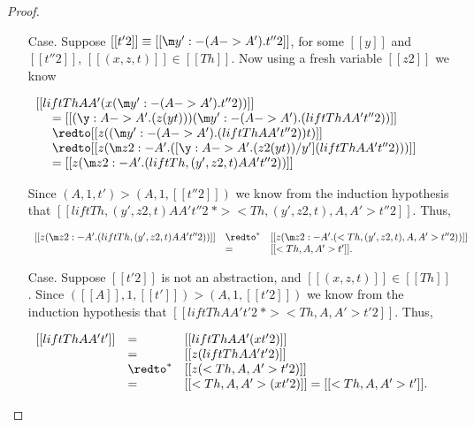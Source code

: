 \begin{proof}
\begin{itemize}
\begin{itemize}
\begin{itemize}
      \item[Case.] Suppose $[[t'2]] \equiv [[\m y':{-(A->A')}.t''2]]$, for some $[[y]]$ and 
        $[[t''2]]$, $[[(x,z,t)]] \in [[Th]]$. 
        Now using a fresh variable $[[z2]]$ we know 
        \begin{center}
          \small
          \begin{math}
            \begin{array}{lll}
              [[lift Th A A' (x (\m y':{-(A->A')}.t''2))]] \\
              \ \ \ \ = [[(\y:A->A'.(z (y t))) (\m y':{-(A->A')}.(lift Th A A' t''2))]]\\ 
              \ \ \ \ \redto [[z ((\m y':{-(A->A')}.(lift Th A A' t''2)) t)]] \\
              \ \ \ \ \redto [[z (\m z2:{-A'}.([\y:A->A'.(z2 (y t))/y'](lift Th A A' t''2)))]] \\
              \ \ \ \ = [[z (\m z2:{-A'}.(lift Th,(y',z2,t) A A' t''2))]]\\
            \end{array}
          \end{math}
        \end{center}
        Since $(A,1,t') > (A,1,[[t''2]])$ we know from the 
        induction hypothesis that $[[lift Th,(y',z2,t) A A' t''2 ~*> <Th,(y',z2,t),A,A'>t''2]]$.
        Thus, 
        \begin{center}
          \small
          \begin{math}
            \begin{array}{lll}
              [[z (\m z2:{-A'}.(lift Th,(y',z2,t) A A' t''2))]] & \redto^* & [[z (\m z2:{-A'}.(<Th,(y',z2,t),A,A'>t''2))]]\\
              & = & [[<Th,A,A'>t']].
            \end{array}
          \end{math}
        \end{center}
        
      \item[Case.] Suppose $[[t'2]]$ is not an abstraction, and $[[(x,z,t)]] \in [[Th]]$. 
        Since $([[A]],1,[[t']]) > (A,1,[[t'2]])$ we know from the 
        induction hypothesis that $[[lift Th A A' t'2 ~*> <Th,A,A'>t'2]]$.  Thus,
        \begin{center}
          \begin{math}
            \begin{array}{lll}
              [[lift Th A A' t']] & = & [[lift Th A A' (x t'2)]]\\ 
              & = & [[z (lift Th A A' t'2)]]\\ 
              & \redto^* & [[z (<Th,A,A'>t'2)]]\\
              & = & [[<Th,A,A'> (x t'2)]] = [[<Th,A,A'>t']].
            \end{array}
          \end{math}
        \end{center}


\end{itemize}
\end{itemize}
\end{itemize}
\end{proof}
